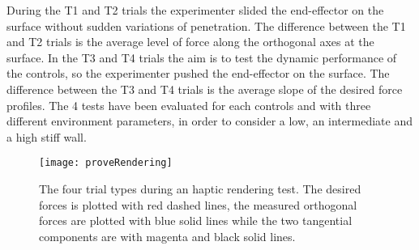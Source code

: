 During the T1 and T2 trials the experimenter slided the end-effector on the surface without sudden variations of penetration. The difference between the T1 and T2 trials is the average level of force along the orthogonal axes at the surface.
In the T3 and T4 trials the aim is to test the dynamic performance of the controls, so the experimenter pushed the end-effector on the surface. The difference between the T3 and T4 trials is the average slope of the desired force profiles.
The 4 tests have been evaluated for each controls and with three different environment parameters, in order to consider a low, an intermediate and a high stiff wall. 
\begin{figure}[htb]
	\centering
	\texttt{[image: proveRendering]}
	\caption{The four trial types during an haptic rendering test. The desired forces is plotted with red dashed lines, the measured orthogonal forces are plotted with blue solid lines while the two tangential components are with magenta and black solid lines.}
	\label{fig:renderingTestType}
\end{figure}

